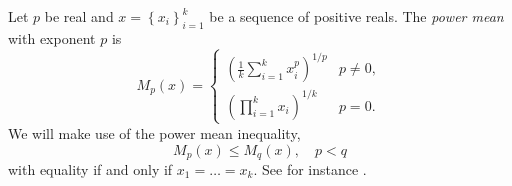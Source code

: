 \documentclass[twoside]{article}
\begin{document}

Let $p$ be real and $x=\left\{ x_{i}\right\} _{i=1}^{k}$ be a sequence
of positive reals. The \emph{power mean} with exponent $p$ is
\[
M_{p}\left(x\right)=\begin{cases}
\left(\frac{1}{k}\sum_{i=1}^{k}x_{i}^{p}\right)^{1/p} & p\neq0,\\
\left(\prod_{i=1}^{k}x_{i}\right)^{1/k} & p=0.
\end{cases}
\]
We will make use of the power mean inequality,
\begin{equation}
M_{p}\left(x\right)\leq M_{q}\left(x\right),\quad p<q\label{eq:generalized mean inequality}
\end{equation}
with equality if and only if $x_{1}=\ldots=x_{k}$. See for instance \citep[][Chapter III]{Bullen2013-os}.
\end{document}
